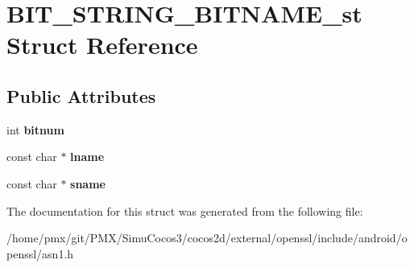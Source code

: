 \hypertarget{structBIT__STRING__BITNAME__st}{}\section{B\+I\+T\+\_\+\+S\+T\+R\+I\+N\+G\+\_\+\+B\+I\+T\+N\+A\+M\+E\+\_\+st Struct Reference}
\label{structBIT__STRING__BITNAME__st}
\subsection*{Public Attributes}
\begin{DoxyCompactItemize}
\item 
\mbox{\label{structBIT__STRING__BITNAME__st_adbddb7cc8584fbb8ae3803eb6d54eec8}} 
int {\bfseries bitnum}
\item 
\mbox{\label{structBIT__STRING__BITNAME__st_afe48ce69e36a9f8b3944c66cf63ee7d2}} 
const char $\ast$ {\bfseries lname}
\item 
\mbox{\label{structBIT__STRING__BITNAME__st_a3b0a04401ca47526b0deba5bce84154e}} 
const char $\ast$ {\bfseries sname}
\end{DoxyCompactItemize}


The documentation for this struct was generated from the following file\+:\begin{DoxyCompactItemize}
\item 
/home/pmx/git/\+P\+M\+X/\+Simu\+Cocos3/cocos2d/external/openssl/include/android/openssl/asn1.\+h\end{DoxyCompactItemize}
